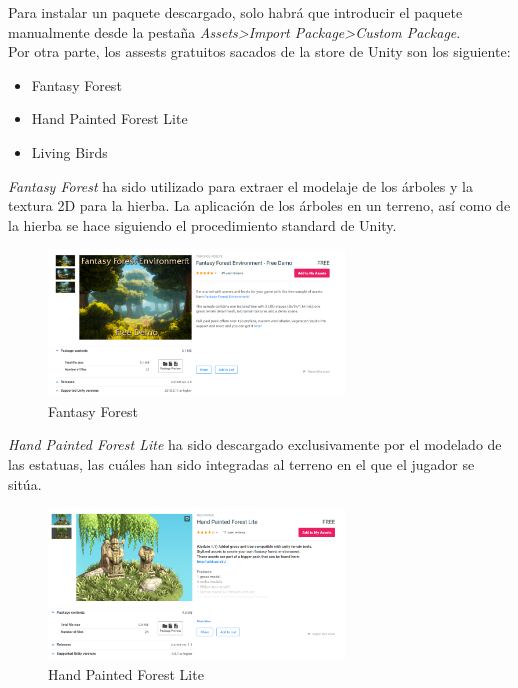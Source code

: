 \quad Para instalar un paquete descargado, solo habrá que introducir el paquete manualmente desde la pestaña \textit{Assets>Import Package>Custom Package}.\\

\quad Por otra parte, los assests gratuitos sacados de la store de Unity son los siguiente:

\begin{itemize}
	\item Fantasy Forest
	\item Hand Painted Forest Lite
	\item Living Birds
\end{itemize}

\quad \textit{Fantasy Forest} ha sido utilizado para extraer el modelaje de los árboles y la textura 2D para la hierba. La aplicación de los árboles en un terreno, así como de la hierba se hace siguiendo el procedimiento standard de Unity.

\begin{figure}[htb]
	\centering
	\includegraphics[width=0.7\textwidth]{./imagenes/fantasyForest}
	\caption{Fantasy Forest}
\end{figure}
\FloatBarrier

\quad \textit{ Hand Painted Forest Lite} ha sido descargado exclusivamente por el modelado de las estatuas, las cuáles han sido integradas al terreno en el que el jugador se sitúa.

\begin{figure}[htb]
	\centering
	\includegraphics[width=0.7\textwidth]{./imagenes/handPaintedForest}
	\caption{Hand Painted Forest Lite}
\end{figure}
\FloatBarrier

